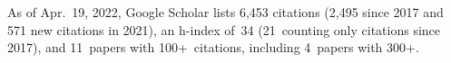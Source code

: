 %
As of Apr.~19, 2022, Google Scholar lists
6,453 citations (2,495 since 2017 and 571 new citations in 2021),
an h-index of~34 (21~counting only citations since 2017),
and 11~papers with 100+~citations, including 4~papers with 300+.

